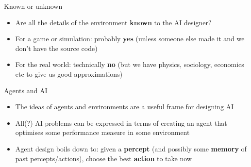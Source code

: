 \begin{frame}{Known or unknown}
    \begin{itemize}
        \pause\item Are all the details of the environment \textbf{known} to the AI designer?
        \pause\item For a game or simulation: probably \textbf{yes}
            (unless someone else made it and we don't have the source code)
        \pause\item For the real world: technically \textbf{no}
            (but we have physics, sociology, economics etc to give us good approximations)
    \end{itemize}
\end{frame}

\begin{frame}{Agents and AI}
    \begin{itemize}
        \pause\item The ideas of agents and environments are a useful frame for designing AI
        \pause\item All(?) AI problems can be expressed in terms of creating an agent
            that optimises some performance measure in some environment
        \pause\item Agent design boils down to: given a \textbf{percept} (and possibly some \textbf{memory} of past percepts/actions),
            choose the best \textbf{action} to take now
    \end{itemize}
\end{frame}
